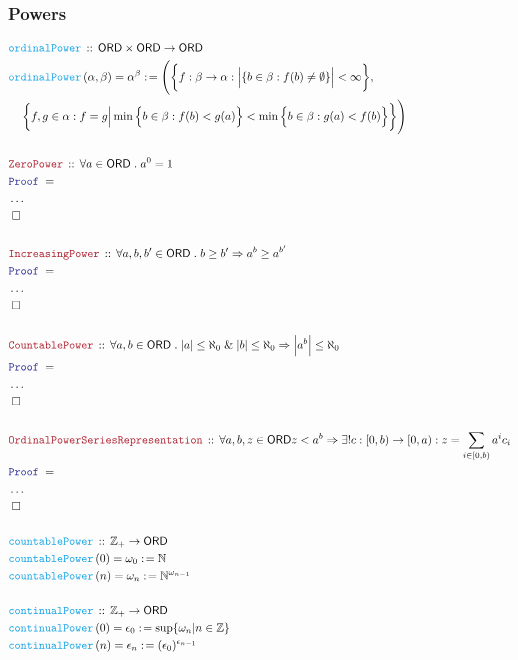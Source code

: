 \documentclass[12pt]{scrartcl}
\newcommand{\FUNC}[1]{\textcolor{Cerulean}{\mathtt{#1}}}
\newcommand{\LOGIC}[1]{\textcolor{Blue}{\mathtt{#1}}}
\newcommand{\THM}[1]{\textcolor{Maroon}{\mathtt{#1}}}
\renewcommand{\.}{\; . \;}
\newcommand{\de}{: \kern 0.1pc =}
\newcommand{\Act}[1]{\left( #1 \right)}
\newcommand{\Theorem}[2]{& \THM{#1} \, :: \, #2 \\ & \Proof = \\ }
\newcommand{\DeclareFunc}[2]{& \FUNC{#1} \, :: \, #2 \\}
\newcommand{\DefineNamedFunc}[4]{&  \FUNC{#1}\Act{#2} = #3 \de #4 \\}
\newcommand{\NewLine}{\\ & \kern 1pc}
\newcommand{\Page}[1]{ \begin{align*} #1 \end{align*}   }
\newcommand{\NoProof}{ & \ldots \\ \EndProof}
\renewcommand{\And}{\; \& \;}
\newcommand{\Imply}{\Rightarrow}
\newcommand{\Int}{\mathbb{Z} }
\newcommand{\Nat}{\mathbb{N} }
\newcommand{\QED}{\; \square}
\newcommand{\EndProof}{& \QED \\}
\newcommand{\Proof}{\LOGIC{Proof} \; }
\newcommand{\ORD}{\mathsf{ORD}}
\begin{document}
\subsubsection{Powers}
\Page{
	\DeclareFunc{ordinalPower}
	{
		\ORD \times \ORD \to \ORD
	}
	\DefineNamedFunc{ordinalPower}{\alpha,\beta}{\alpha^\beta}
	{
		\Bigg(
			\bigg\{
				f : \beta \to \alpha  :
				\Big|\{ b \in \beta :  f(b) \neq \emptyset   \}\Big| < \infty
			\bigg\}, \NewLine 
			\bigg\{
				f,g \in \alpha :  
				f= g \Big| \min \Big\{ b \in \beta : f(b) < g(a)\Big\} < \min \Big\{ b \in \beta : g(a) < f(b) \Big\}      
			\bigg\}
		\Bigg)
	}
	\\
	\Theorem{ZeroPower}
	{
		\forall a \in \ORD \. 
		a^0 = 1
	}
	\NoProof
	\\
	\Theorem{IncreasingPower}
	{
		\forall a,b,b' \in \ORD \. 
		b \ge  b' \Imply
		a^b \ge a^{b'}
	}
	\NoProof
	\\
	\Theorem{CountablePower}
	{
		\forall a,b \in \ORD \.
		|a| \le \aleph_0 \And |b| \le \aleph_0 \Imply
		\Big|a^b\Big| \le \aleph_0
	}
	\NoProof
	\\
	\Theorem{OrdinalPowerSeriesRepresentation}
	{
		\forall a,b,z \in \ORD
		z  <  a^b \Imply 
		\exists! c : [0,b) \to [0,a) :
		z = \sum_{i \in [0,b)} a^i c_i
	}
	\NoProof
	\\
	\DeclareFunc{countablePower}{\Int_+ \to \ORD}
	\DefineNamedFunc{countablePower}{0}{\omega_0}{\Nat}
	\DefineNamedFunc{countablePower}{n}{ \omega_n   }{\Nat^{\omega_{n-1}}}
	\\
	\DeclareFunc{continualPower}{\Int_+ \to \ORD}
	\DefineNamedFunc{continualPower}{0}{\epsilon_0}{\sup \{ \omega_n | n \in \Int \}}
	\DefineNamedFunc{continualPower}{n}{ \epsilon_n}{(\epsilon_0)^{\epsilon_{n-1}}}
}
\newpage
\end{document}
